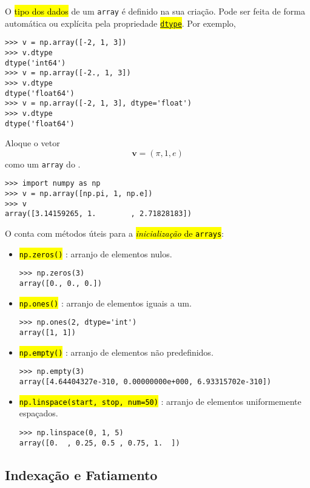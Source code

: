 O \hl{tipo dos dados} de um \lstinline+array+ é definido na sua criação. Pode ser feita de forma automática ou explícita pela propriedade \hl{{\href{https://numpy.org/doc/stable/reference/arrays.dtypes.html}{\lstinline+dtype+}}}. Por exemplo,
\begin{lstlisting}
>>> v = np.array([-2, 1, 3])
>>> v.dtype
dtype('int64')
>>> v = np.array([-2., 1, 3])
>>> v.dtype
dtype('float64')
>>> v = np.array([-2, 1, 3], dtype='float')
>>> v.dtype
dtype('float64')
\end{lstlisting}

\begin{ex}
  Aloque o vetor
  \begin{equation}
    \pmb{v} = (\pi, 1, e)
  \end{equation}
  como um \lstinline+array+ do {\numpy}.
\begin{lstlisting}
>>> import numpy as np
>>> v = np.array([np.pi, 1, np.e])
>>> v
array([3.14159265, 1.        , 2.71828183])
\end{lstlisting}
\end{ex}

O {\numpy} conta com métodos úteis para a \hl{\emph{inicialização} de {\lstinline+arrays+}}:
\begin{itemize}
\item \hl{{\lstinline+np.zeros()+}} : arranjo de elementos nulos.
\begin{lstlisting}
>>> np.zeros(3)
array([0., 0., 0.])
\end{lstlisting}
\item \hl{{\lstinline+np.ones()+}} : arranjo de elementos iguais a um.
\begin{lstlisting}
>>> np.ones(2, dtype='int')
array([1, 1])
\end{lstlisting}
\item \hl{{\lstinline+np.empty()+}} : arranjo de elementos não predefinidos.
\begin{lstlisting}
>>> np.empty(3)
array([4.64404327e-310, 0.00000000e+000, 6.93315702e-310])
\end{lstlisting}
\item \hl{{\lstinline+np.linspace(start, stop, num=50)+}} : arranjo de elementos uniformemente espaçados.
\begin{lstlisting}
>>> np.linspace(0, 1, 5)
array([0.  , 0.25, 0.5 , 0.75, 1.  ])
\end{lstlisting}
\end{itemize}

\subsection{Indexação e Fatiamento}\label{cap_arr_sec_arr:ssec:islice}

